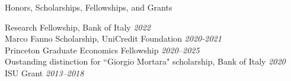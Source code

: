 \documentclass{resume} %
\begin{document}







\begin{rSection}{Honors, Scholarships, Fellowships, and Grants}

Research Fellowship, Bank of Italy \medskip \hfill{\em 2022} \\
Marco Fanno Scholarship, UniCredit Foundation \medskip \hfill{\em 2020-2021} \\
Princeton Graduate Economics Fellowship \medskip \hfill { \em 2020--2025} \\
Oustanding distinction for ``Giorgio Mortara" scholarship, Bank of Italy \medskip \hfill {\em 2020} \\
ISU Grant \medskip \hfill {\em 2013--2018}

\end{rSection}
\end{document}
